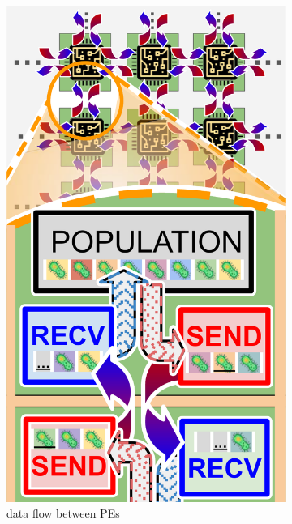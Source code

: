 \begin{figure}[t!]
  \centering
  \begin{subfigure}{0.5\linewidth}
    \centering
    \footnotesize
    \includegraphics[width=0.8\linewidth]{img/dataflow-schematic}
    \vspace{-0.05in}
    \caption{data flow between PEs}
  \end{subfigure}%
  \begin{subfigure}{0.5\linewidth}
    \footnotesize
    \centering

\end{subfigure}
\end{figure}
